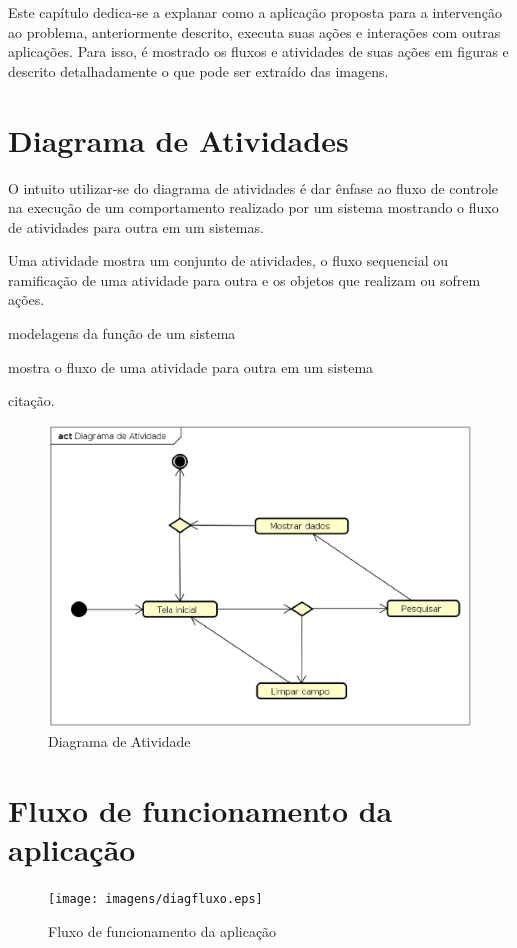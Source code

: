 Este capítulo dedica-se a explanar como a aplicação proposta para a intervenção ao problema, anteriormente descrito, executa suas ações e interações com outras aplicações. Para isso, é mostrado os fluxos e atividades de suas ações em figuras e descrito detalhadamente o que pode ser extraído das imagens.

\section{Diagrama de Atividades}
O intuito utilizar-se do diagrama de atividades é dar ênfase ao fluxo de controle na execução de um comportamento realizado por um sistema mostrando o fluxo de atividades para outra em um sistemas.

Uma atividade mostra um conjunto de atividades, o fluxo sequencial ou ramificação de uma atividade para outra e os objetos que realizam ou sofrem ações.

modelagens da função de um sistema

mostra o fluxo de uma atividade para outra em um sistema

citação\cite{Booch:2012}.

\begin{figure}[!htb]
        \caption{\label{diagrama1}Diagrama de Atividade}
        \begin{center}
                \includegraphics[width=\textwidth]{imagens/diagact.eps}
        \end{center}
\end{figure}

\section{Fluxo de funcionamento da aplicação}

\begin{figure}[!htb]
        \caption{\label{diagrama1}Fluxo de funcionamento da aplicação}
        \begin{center}
                \texttt{[image: imagens/diagfluxo.eps]}
        \end{center}
\end{figure}
